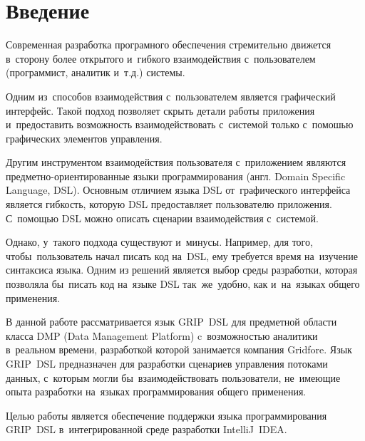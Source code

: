 \chapter*{Введение}                         %



Современная разработка програмного обеспечения стремительно движется в~сторону более открытого и~гибкого взаимодействия с~пользователем (программист, аналитик и~т.д.) системы. 

Одним из~способов взаимодействия с~пользователем является графический интерфейс. Такой подход позволяет скрыть детали работы приложения и~предоставить возможность взаимодействовать с~системой только с~помошью графических элементов управления.

Другим инструментом взаимодействия пользователя с~приложением являются предметно-ориентированные языки программирования (англ. Domain Specific Language, DSL). Основным отличием языка DSL от~графического интерфейса является гибкость, которую DSL предоставляет пользователю приложения. С~помощью DSL можно описать сценарии взаимодействия с~системой. 

Однако, у~такого подхода существуют и~минусы. Например, для того, чтобы~пользователь начал писать код на~DSL, ему требуется время на~изучение синтаксиса языка. Одним из решений является выбор среды разработки, которая позволяла бы~писать код на~языке DSL так~же~удобно, как и~на~языках общего применения. 

В данной работе рассматривается язык GRIP~DSL для предметной области класса DMP (Data Management Platform) c~возможностью аналитики в~реальном времени, разработкой которой занимается компания Gridfore. Язык GRIP~DSL предназначен для разработки сценариев управления потоками данных, с~которым могли бы~взаимодействовать пользователи, не~имеющие опыта разработки на~языках программирования общего применения.

Целью работы является обеспечение поддержки языка программирования GRIP~DSL в~интегрированной среде разработки IntelliJ~IDEA.

